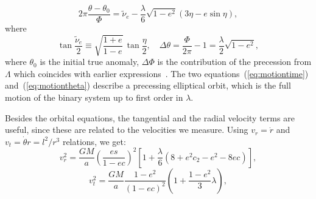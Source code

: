 %
%
%
\begin{equation}
2\pi\frac{\theta - \theta_0}{\Phi} = \tilde{\nu}_e - \frac{\lambda}{6} \sqrt{1-e^2}  \left(3 \eta  - e \sin \eta \right),
\label{eq:motiontheta}
\end{equation}
%
where
%
\begin{equation}
\tan\frac{\tilde{\nu}_e}{2} \equiv \sqrt{\frac{1+e}{1-e}} \, \tan \frac{\eta}{2}, \quad \Delta\theta = \frac{\Phi}{2 \pi} - 1 = \frac{\lambda}{2} \sqrt{1-e^2},
\end{equation}
%
where $\theta_0$ is the initial true anomaly, $\Delta \Phi$ is the contribution of the precession from $\Lambda$ which coincides with earlier expressions~\citep{Kerr:2003bp,Iorio:2007ub}. The two equations~(\ref{eq:motiontime}) and~(\ref{eq:motiontheta}) describe a precessing elliptical orbit, which is the full motion of the binary system up to first order in $\lambda$. 

Besides the orbital equations, the tangential and the radial velocity terms are useful, since these are related to the velocities we measure. Using $v_r = \dot{r}$ and $v_t = \dot{\theta} r =l^2/r^3$ relations, we get:
%
\begin{equation}
v_r^2 = \frac{G M}{a}\left(\frac{e s}{1 - e c}\right)^2 \left[1 + \frac{\lambda}{6}   \left(8 + e^2 c_2-e^2-8 e c \right)\right],
\label{eq:vr}
%
\end{equation}
\begin{equation}
v_t^2 = \frac{G M}{a} \frac{1-e^2}{\left(1- e c\right)^2} \left(1 +\frac{1-e^2}{3}\lambda \right),
\label{eq:vt}
\end{equation}
%

